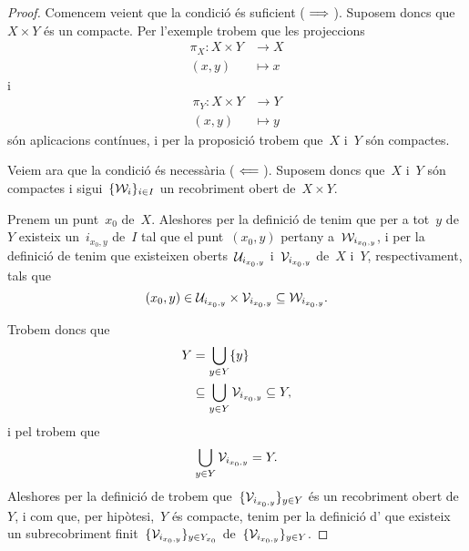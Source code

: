 \documentclass[../topologia.tex]{subfiles}
\begin{document}
    \begin{proof}
        Comencem veient que la condició és suficient (\(\implies\)).
        Suposem doncs que~\(X\times Y\) és un compacte.
        Per l'exemple  trobem que les projeccions
        \begin{align*}
            \pi_{X}\colon X\times Y&\longrightarrow X \\
            (x,y)&\longmapsto x
        \end{align*}
        i
        \begin{align*}
            \pi_{Y}\colon X\times Y&\longrightarrow Y \\
            (x,y)&\longmapsto y
        \end{align*}
        són aplicacions contínues, i per la proposició  trobem que~\(X\) i~\(Y\) són compactes.

        Veiem ara que la condició és necessària (\(\impliedby\)).
        Suposem doncs que~\(X\) i~\(Y\) són compactes i sigui~\(\{\mathcal{W}_{i}\}_{i\in I}\) un recobriment obert de~\(X\times Y\).

        Prenem un punt~\(x_{0}\) de~\(X\).
        Aleshores per la definició de  tenim que per a tot~\(y\) de~\(Y\) existeix un~\(i_{x_{0},y}\) de~\(I\) tal que el punt~\((x_{0},y)\) pertany a~\(\mathcal{W}_{i_{x_{0},y}}\), i per la definició de  tenim que existeixen oberts~\(\mathcal{U}_{i_{x_{0},y}}\) i~\(\mathcal{V}_{i_{x_{0},y}}\) de~\(X\) i~\(Y\), respectivament, tals que
        \[
            (x_{0},y)\in\mathcal{U}_{i_{x_{0},y}}\times\mathcal{V}_{i_{x_{0},y}}\subseteq\mathcal{W}_{i_{x_{0},y}}.
        \]

        Trobem doncs que
        \begin{align*}
            Y&=\bigcup_{y\in Y}\{y\} \\
            &\subseteq\bigcup_{y\in Y}\mathcal{V}_{i_{x_{0},y}}\subseteq Y,
        \end{align*}
        i pel  trobem que
        \[
            \bigcup_{y\in Y}\mathcal{V}_{i_{x_{0},y}}=Y.
        \]
        Aleshores per la definició de  trobem que~\(\{\mathcal{V}_{i_{x_{0},y}}\}_{y\in Y}\) és un recobriment obert de~\(Y\), i com que, per hipòtesi,~\(Y\) és compacte, tenim per la definició d' que existeix un subrecobriment finit~\(\{\mathcal{V}_{i_{x_{0},y}}\}_{y\in Y_{x_{0}}}\) de~\(\{\mathcal{V}_{i_{x_{0},y}}\}_{y\in Y}\).


\end{proof}
\end{document}
